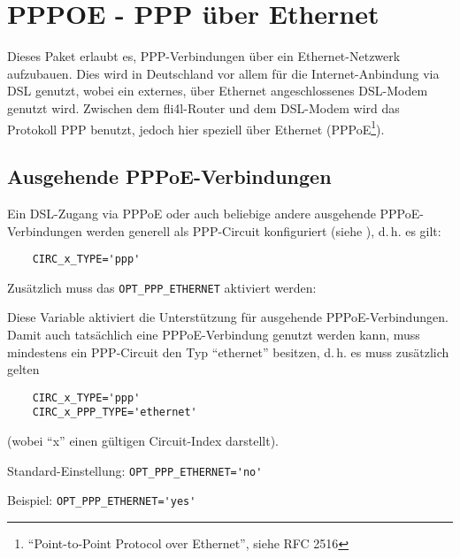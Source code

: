 \section{PPPOE - PPP über Ethernet}

Dieses Paket erlaubt es, PPP-Verbindungen über ein Ethernet-Netzwerk aufzubauen.
Dies wird in Deutschland vor allem für die Internet-Anbindung via DSL genutzt,
wobei ein externes, über Ethernet angeschlossenes DSL-Modem genutzt wird.
Zwischen dem fli4l-Router und dem DSL-Modem wird das Protokoll PPP benutzt,
jedoch hier speziell über Ethernet (PPPoE\footnote{``Point-to-Point Protocol
over Ethernet'', siehe RFC 2516}).

\subsection{Ausgehende PPPoE-Verbindungen}

Ein DSL-Zugang via PPPoE oder auch beliebige andere ausgehende
PPPoE-Verbindungen werden generell als PPP-Circuit konfiguriert
(siehe ), d.\,h. es gilt:

\begin{example}
\begin{verbatim}
    CIRC_x_TYPE='ppp'
\end{verbatim}
\end{example}

Zusätzlich muss das \verb+OPT_PPP_ETHERNET+ aktiviert werden:

\begin{description}

Diese Variable aktiviert die Unterstützung für ausgehende PPPoE-Verbindungen.
Damit auch tatsächlich eine PPPoE-Verbindung genutzt werden kann, muss
mindestens ein PPP-Circuit den Typ ``ethernet'' besitzen, d.\,h. es muss
zusätzlich gelten

\begin{example}
\begin{verbatim}
    CIRC_x_TYPE='ppp'
    CIRC_x_PPP_TYPE='ethernet'
\end{verbatim}
\end{example}

(wobei ``x'' einen gültigen Circuit-Index darstellt).

Standard-Einstellung: \verb+OPT_PPP_ETHERNET='no'+

Beispiel: \verb+OPT_PPP_ETHERNET='yes'+
\end{description}

